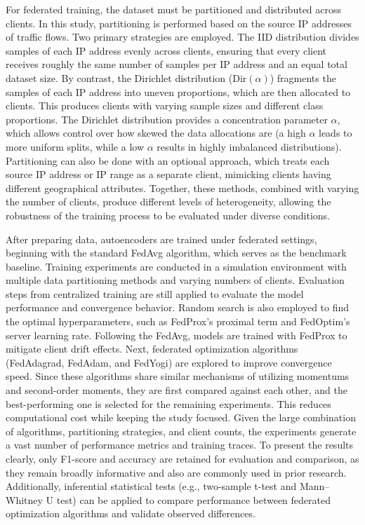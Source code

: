 For federated training, the dataset must be partitioned and distributed across clients. In this study, partitioning is performed based on the source IP addresses of traffic flows. Two primary strategies are employed. The IID distribution divides samples of each IP address evenly across clients, ensuring that every client receives roughly the same number of samples per IP address and an equal total dataset size. By contrast, the Dirichlet distribution ($\text{Dir}(\alpha)$) fragments the samples of each IP address into uneven proportions, which are then allocated to clients. This produces clients with varying sample sizes and different class proportions. The Dirichlet distribution provides a concentration parameter $\alpha$, which allows control over how skewed the data allocations are (a high $\alpha$ leads to more uniform splits, while a low $\alpha$ results in highly imbalanced distributions). Partitioning can also be done with an optional approach, which treats each source IP address or IP range as a separate client, mimicking clients having different geographical attributes. Together, these methods, combined with varying the number of clients, produce different levels of heterogeneity, allowing the robustness of the training process to be evaluated under diverse conditions.

After preparing data, autoencoders are trained under federated settings, beginning with the standard FedAvg algorithm, which serves as the benchmark baseline. Training experiments are conducted in a simulation environment with multiple data partitioning methods and varying numbers of clients. Evaluation steps from centralized training are still applied to evaluate the model performance and convergence behavior. Random search is also employed to find the optimal hyperparameters, such as FedProx's proximal term and FedOptim's server learning rate. Following the FedAvg, models are trained with FedProx to mitigate client drift effects. Next, federated optimization algorithms (FedAdagrad, FedAdam, and FedYogi) are explored to improve convergence speed. Since these algorithms share similar mechanisms of utilizing momentums and second-order moments, they are first compared against each other, and the best-performing one is selected for the remaining experiments. This reduces computational cost while keeping the study focused. Given the large combination of algorithms, partitioning strategies, and client counts, the experiments generate a vast number of performance metrics and training traces. To present the results clearly, only F1-score and accuracy are retained for evaluation and comparison, as they remain broadly informative and also are commonly used in prior research. Additionally, inferential statistical tests (e.g., two-sample t-test and Mann–Whitney U test) can be applied to compare performance between federated optimization algorithms and validate observed differences.

